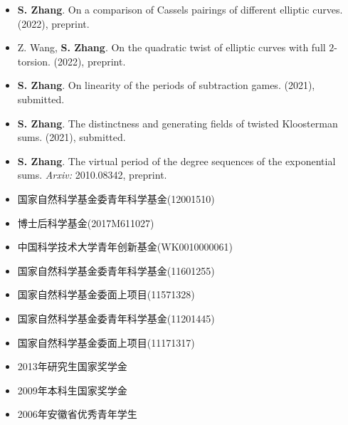 \documentclass[11pt,a4paper]{article}
\begin{document}
\begin{itemize}
\item \textbf{S. Zhang}.
On a comparison of Cassels pairings of different elliptic curves.
(2022), preprint.

\item Z. Wang, \textbf{S. Zhang}.
On the quadratic twist of elliptic curves with full $2$-torsion.
(2022), preprint.

\item \textbf{S. Zhang}.
On linearity of the periods of subtraction games.
(2021), submitted.

\item \textbf{S. Zhang}.
The distinctness and generating fields of twisted Kloosterman sums.
(2021), submitted.

\item \textbf{S. Zhang}.
The virtual period of the degree sequences of the exponential sums.
{\em Arxiv:} 2010.08342, preprint.
\end{itemize}


\begin{itemize}
\item 国家自然科学基金委青年科学基金(12001510)
\item 博士后科学基金(2017M611027)
\end{itemize}


\begin{itemize}
\item 中国科学技术大学青年创新基金(WK0010000061)
\item 国家自然科学基金委青年科学基金(11601255)
\item 国家自然科学基金委面上项目(11571328)
\item 国家自然科学基金委青年科学基金(11201445)
\item 国家自然科学基金委面上项目(11171317)
\end{itemize}


\begin{itemize}
\item 2013年研究生国家奖学金
\item 2009年本科生国家奖学金
\item 2006年安徽省优秀青年学生
\end{itemize}


\end{document}
